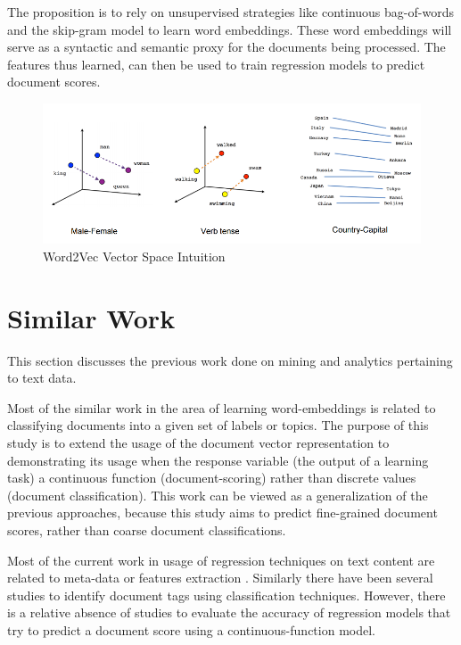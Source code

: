 \documentclass[conference]{IEEEtran}
\begin{document}
    The proposition is to rely on unsupervised strategies like continuous bag-of-words and the skip-gram model to learn word embeddings.
    These word embeddings will serve as a syntactic and semantic proxy for the documents being processed. 
    The features thus learned, can then be used to train regression models to predict document scores.

\begin{figure}[ht]
    \centering
    \includegraphics[width=\textwidth]{images/word2vec_1.png}
    \caption{Word2Vec Vector Space Intuition\cite{tensorflow_word2vec}}
    \label{fig:word2vec-vectorspace-intuition}
\end{figure}

\vspace{5mm}

\section{Similar Work}
    This section discusses the previous work done on mining and analytics pertaining to text data.

    Most of the similar work in the area of learning word-embeddings is related to classifying documents into a given set of labels or topics. 
    The purpose of this study is to extend the usage of the document vector representation to demonstrating its usage when the response variable (the output of a learning task) a continuous function (document-scoring) rather than discrete values (document classification). 
    This work can be viewed as a generalization of the previous approaches, because this study aims to predict fine-grained document scores, rather than coarse document classifications.

    Most of the current work in usage of regression techniques on text content are related to meta-data or features extraction \cite{su2015genetic}\cite{weissman2016natural}.
    Similarly there have been several studies to identify document tags using classification techniques\cite{bespalov2011sentiment}\cite{pang2002thumbs}. 
    However, there is a relative absence of studies to evaluate the accuracy of regression models that try to predict a document score using a continuous-function model.
\end{document}
